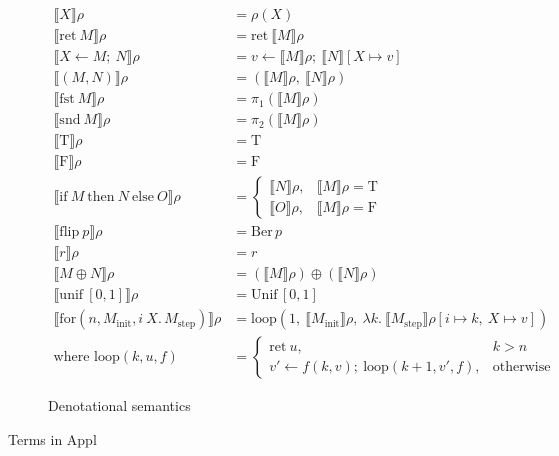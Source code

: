 \begin{figure}[tbp]
  \begin{subfigure}[t]{0.95\linewidth}
    \centering
\[
\begin{aligned}
\llbracket X \rrbracket \rho &= \rho(X) \\
\llbracket \mathrm{ret}\ M \rrbracket \rho &= \mathrm{ret}\ \llbracket M \rrbracket \rho \\
\llbracket X \leftarrow M;\ N \rrbracket \rho &= v \leftarrow \llbracket M \rrbracket \rho;\ \llbracket N \rrbracket [X \mapsto v] \\
\llbracket (M,N) \rrbracket \rho &= (\llbracket M \rrbracket \rho,\ \llbracket N \rrbracket \rho) \\
\llbracket \mathrm{fst}\ M \rrbracket \rho &= \pi_1(\llbracket M \rrbracket \rho) \\
\llbracket \mathrm{snd}\ M \rrbracket \rho &= \pi_2(\llbracket M \rrbracket \rho) \\
\llbracket \mathrm{T} \rrbracket \rho &= \mathrm{T} \\
\llbracket \mathrm{F} \rrbracket \rho &= \mathrm{F} \\
\llbracket \mathrm{if}\ M\ \mathrm{then}\ N\ \mathrm{else}\ O \rrbracket \rho &=
\begin{cases}
  \llbracket N \rrbracket \rho, & \llbracket M \rrbracket \rho = \mathrm{T} \\
  \llbracket O \rrbracket \rho, & \llbracket M \rrbracket \rho = \mathrm{F}
\end{cases} \\
\llbracket \mathrm{flip}\ p \rrbracket \rho &= \mathrm{Ber}\,p \\
\llbracket r \rrbracket \rho &= r \\
\llbracket M \oplus N \rrbracket \rho &= (\llbracket M \rrbracket \rho) \oplus (\llbracket N \rrbracket \rho) \\
\llbracket \mathrm{unif}\ [0,1] \rrbracket \rho &= \mathrm{Unif}\,[0,1] \\
\llbracket \mathrm{for}(n, M_{\mathrm{init}}, i\ X.\, M_{\mathrm{step}}) \rrbracket \rho
&= \mathrm{loop}\!\left(1,\ \llbracket M_{\mathrm{init}} \rrbracket \rho,\ \lambda k.\ \llbracket M_{\mathrm{step}} \rrbracket \rho[i \mapsto k,\ X \mapsto v]\right) \\
\text{where }\mathrm{loop}(k,u,f) &=
\begin{cases}
  \mathrm{ret}\ u, & k > n \\
  v' \leftarrow f(k,v);\ \mathrm{loop}(k+1,v',f), & \text{otherwise}
\end{cases}
\end{aligned}
\]
    \caption{Denotational semantics}
    \label{fig:term-semantics}
  \end{subfigure}
  \caption{Terms in Appl}
  \label{fig:terms}
\end{figure}

